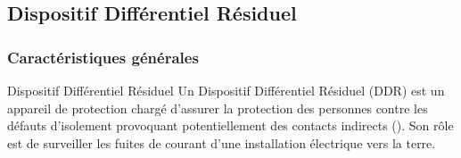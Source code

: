 \subsection{Dispositif Différentiel Résiduel\label{subsec:DDR}}

\subsubsection{Caractéristiques générales}

\begin{definition}{Dispositif Différentiel Résiduel}{}
Un Dispositif Différentiel Résiduel (DDR) est un appareil de protection chargé d'assurer la protection des personnes contre les défauts d'isolement provoquant potentiellement des contacts indirects (). Son rôle est de surveiller les fuites de courant d'une installation électrique vers la terre.
\end{definition}

